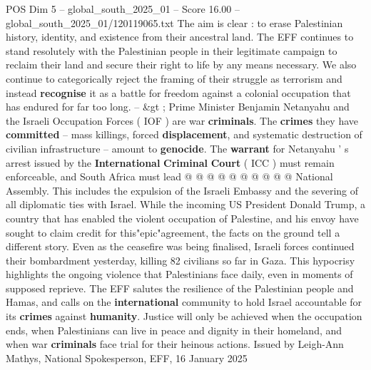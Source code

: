 \begin{textsample}{POS Dim 5 – global\_south\_2025\_01 – Score 16.00 – global\_south\_2025\_01/120119065.txt}
The aim is clear : to erase Palestinian history, identity, and existence from their ancestral land.
The EFF continues to stand resolutely with the Palestinian people in their legitimate campaign to reclaim their land and secure their right to life by any means necessary.
We also continue to categorically reject the framing of their struggle as terrorism and instead \textbf{recognise} it as a battle for freedom against a colonial occupation that has endured for far too long. -- \&gt ; Prime Minister Benjamin Netanyahu and the Israeli Occupation Forces ( IOF ) are war \textbf{criminals}.
The \textbf{crimes} they have \textbf{committed} -- mass killings, forced \textbf{displacement}, and systematic destruction of civilian infrastructure -- amount to \textbf{genocide}.
The \textbf{warrant} for Netanyahu ' s arrest issued by the \textbf{International} \textbf{Criminal} \textbf{Court} ( ICC ) must remain enforceable, and South Africa must lead @ @ @ @ @ @ @ @ @ @ National Assembly.
This includes the expulsion of the Israeli Embassy and the severing of all diplomatic ties with Israel.
While the incoming US President Donald Trump, a country that has enabled the violent occupation of Palestine, and his envoy have sought to claim credit for this"epic"agreement, the facts on the ground tell a different story.
Even as the ceasefire was being finalised, Israeli forces continued their bombardment yesterday, killing 82 civilians so far in Gaza.
This hypocrisy highlights the ongoing violence that Palestinians face daily, even in moments of supposed reprieve.
The EFF salutes the resilience of the Palestinian people and Hamas, and calls on the \textbf{international} community to hold Israel accountable for its \textbf{crimes} against \textbf{humanity}.
Justice will only be achieved when the occupation ends, when Palestinians can live in peace and dignity in their homeland, and when war \textbf{criminals} face trial for their heinous actions.
Issued by Leigh-Ann Mathys, National Spokesperson, EFF, 16 January 2025

\end{textsample}
